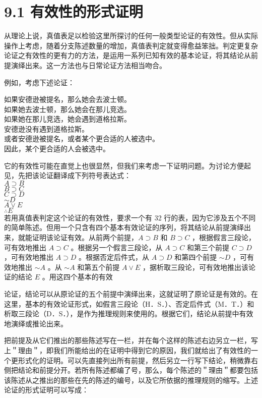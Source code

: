 \section*{9.1 有效性的形式证明}
从理论上说，真值表足以检验这里所探讨的任何一般类型论证的有效性。但从实际操作上考虑，随着分支陈述数量的增加，真值表判定就变得愈益笨拙。判定更复杂论证之有效性的更有力的方法，是运用一系列已知有效的基本论证，将其结论从前提演绎出来。这一方法也与日常论证方法相当吻合。

例如，考虑下述论证：

如果安德逊被提名，那么她会去波士顿。\\
如果她去波士顿，那么她会在那儿竞选。\\
如果她在那儿竞选，她会遇到道格拉斯。\\
安德逊没有遇到道格拉斯。\\
或者安德逊被提名，或者某个更合适的人被选中。\\
因此，某个更合适的人会被选中。

它的有效性可能在直觉上也很显然，但我们来考虑一下证明问题。为讨论方便起见，先把该论证翻译成下列符号表达式：\\
$A \supset B$\\
$B \supset C$\\
$C \supset D$\\
$\sim D$\\
$A \vee E$\\
$\therefore E$\\
若用真值表判定这个论证的有效性，要求一个有 32 行的表，因为它涉及五个不同的简单陈述。但用一个只含有四个基本有效论证的序列，将其结论从前提演绎出来，就能证明该论证有效。从前两个前提，$A \supset B$ 和 $B \supset C$ ，根据假言三段论，可有效地推出 $A \supset C$ 。根据另一个假言三段论，从 $A \supset C$ 和第三个前提 $C \supset D$ ，可有效地推出 $A \supset D$ 。根据否定后件式，从 $A \supset D$ 和第四个前提 $\sim D$ ，可有效地推出 $\sim A$ 。从 $\sim A$ 和第五个前提 $A \vee E$ ，据析取三段论，可有效地推出该论证的结论 $E$ 。用这四个基本的有效

论证，结论可以从原论证的五个前提中演绎出来，这就证明了原论证是有效的。在这里，基本的有效论证形式，如假言三段论（H．S．）、否定后件式（M．T．）和析取三段论（D．S．），是作为推理规则来使用的。根据它们，结论从前提中有效地演绎或推论出来。

把前提及从它们推出的那些陈述写在一栏，并在每个这样的陈述右边另立一栏，写上＂理由＂，即我们所能给出的在证明中得到它的原因，我们就给出了有效性的一个更形式化的证明。可以先直接列出所有前提，然后另立一行写下结论，稍微靠右侧把结论和前提分开。若所有陈述都编了号，那么，每个陈述的＂理由＂都要包括该陈述从之推出的那些在先的陈述的编号，以及它所依据的推理规则的缩写。上述论证的形式证明可以写成：

